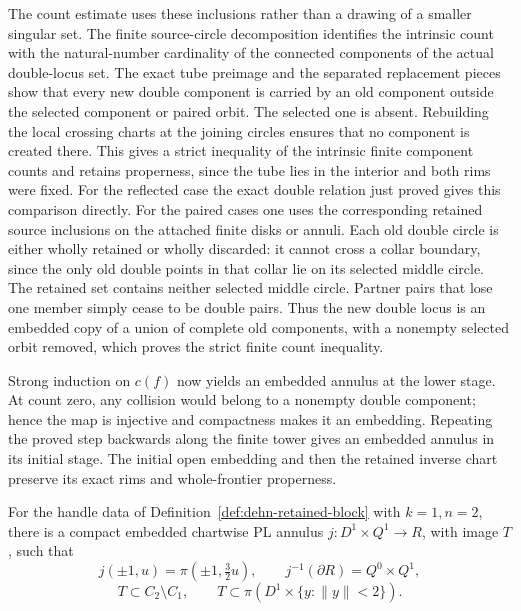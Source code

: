 The count estimate uses these inclusions rather than a drawing of a
smaller singular set.  The finite source-circle decomposition identifies
the intrinsic count with the natural-number cardinality of the connected
components of the actual double-locus set.  The exact tube preimage and
the separated replacement pieces show that every new double component
is carried by an old component outside the selected component or paired orbit.
The selected one is absent.  Rebuilding the local crossing charts
at the joining circles ensures that no component is created there.
This gives a strict inequality of the intrinsic finite component
counts and retains properness, since the tube lies in the interior
and both rims were fixed.  For the reflected case the exact double
relation just proved gives this comparison directly.  For the
paired cases one uses the corresponding retained source inclusions
on the attached finite disks or annuli.  Each old double circle is
either wholly retained or wholly discarded: it cannot cross a
collar boundary, since the only old double points in that collar
lie on its selected middle circle.  The retained set contains neither
selected middle circle.  Partner pairs that lose one member simply
cease to be double pairs.  Thus the new double locus is an embedded
copy of a union of complete old components, with a nonempty selected
orbit removed, which proves the strict finite count inequality.

Strong induction on $c(f)$ now yields an embedded annulus at the
lower stage.  At count zero, any collision would belong to a
nonempty double component; hence the map is injective and compactness
makes it an embedding.  Repeating the proved step backwards along
the finite tower gives an embedded annulus in its initial stage.
The initial open embedding and then the retained inverse chart
preserve its exact rims and whole-frontier properness.

\begin{theorem}
\label{thm:dehn-protected-annulus}
For the handle data of Definition~\ref{def:dehn-retained-block} with
$k=1,n=2$, there is a compact embedded chartwise PL annulus
$j:D^1\times Q^1\to R$, with image $T$, such that
\[
 j(\pm1,u)=\pi(\pm1,\tfrac32u),\qquad
 j^{-1}(\partial R)=Q^0\times Q^1,
\]
\[
      T\subset C_2\setminus C_1,
      \qquad T\subset\pi(D^1\times\{y:\|y\|<2\}).
\]
\end{theorem}

